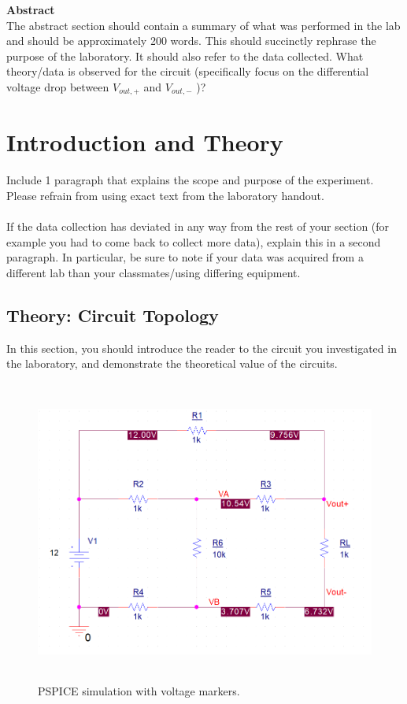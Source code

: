 \documentclass[11pt]{article}
\begin{document}
\newpage
\Large \textbf{Abstract} \\
\normalsize
The abstract section should contain a summary of what was performed in the lab and should be approximately  200 words.  This should succinctly rephrase the purpose of the laboratory.  It should also refer to the data collected.    What theory/data is observed for the circuit (specifically focus on the differential voltage drop between $V_{out,+}$ and $V_{out,-}$ )?
\section {Introduction and Theory}
\paragraph{} Include 1 paragraph that explains the scope and purpose of the experiment. Please refrain from using exact text from the laboratory handout. 
\paragraph{} If the data collection has deviated in any way from the rest of your section (for example you had to come back to collect more data), explain this in a second paragraph.  In particular, be sure to note if your data was acquired from a different lab than your classmates/using differing equipment. 
\subsection{Theory: Circuit Topology}
\label{Section:CircuitTopology}
In this section, you should introduce the reader to the circuit you investigated in the laboratory, and demonstrate the theoretical value of the circuits. 

\begin{figure}[htbp]
	\centering
	\includegraphics[height=10cm]{schematic}
	\caption{PSPICE simulation with voltage markers.}
	\label{fig:simulation}
\end{figure}
\end{document}
